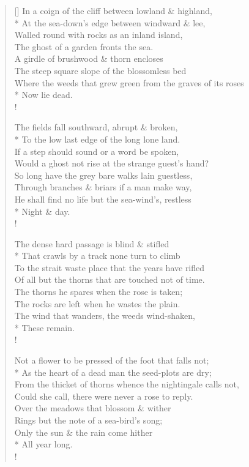 \documentclass[MAIN]{subfiles}
\begin{document}
\settowidth{\versewidth}{In a coign of the cliff between lowland \& highland,}
\begin{verse}[\versewidth]
In a coign of the cliff between lowland \& highland,\\* 
\vin At the sea-down's edge between windward \& lee,\\ 
Walled round with rocks as an inland island,\\
\vin The ghost of a garden fronts the sea.\\
A girdle of brushwood \& thorn encloses\\ 
\vin The steep square slope of the blossomless bed\\ 
Where the weeds that grew green from the graves of its roses\\*
\vin \vin \vin Now lie dead.\\!

The fields fall southward, abrupt \& broken,\\*
\vin To the low last edge of the long lone land.\\
If a step should sound or a word be spoken,\\
\vin Would a ghost not rise at the strange guest's hand?\\ 
So long have the grey bare walks lain guestless,\\
\vin Through branches \& briars if a man make way,\\
He shall find no life but the sea-wind's, restless\\* 
\vin \vin \vin Night \& day.\\!

The dense hard passage is blind \& stifled\\*
\vin That crawls by a track none turn to climb\\
To the strait waste place that the years have rifled\\
\vin Of all but the thorns that are touched not of time.\\
The thorns he spares when the rose is taken;\\
\vin The rocks are left when he wastes the plain.\\
The wind that wanders, the weeds wind-shaken,\\*
\vin \vin \vin These remain.\\!

Not a flower to be pressed of the foot that falls not;\\*
\vin As the heart of a dead man the seed-plots are dry;\\
From the thicket of thorns whence the nightingale calls not,\\
\vin Could she call, there were never a rose to reply.\\
Over the meadows that blossom \& wither\\
\vin Rings but the note of a sea-bird's song;\\
Only the sun \& the rain come hither\\*
\vin \vin \vin All year long.\\!


\end{verse}
\end{document}
